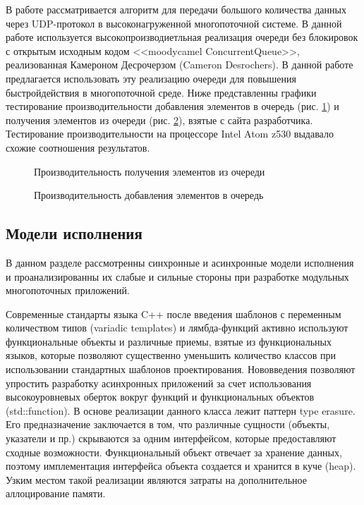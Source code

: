 В работе \cite{syzovalgorithm} рассматривается алгоритм для передачи большого количества данных через UDP-протокол в высоконагруженной многопоточной системе. В данной работе используется высокопроизводиетльная реализация очереди без блокировок с открытым исходным кодом <<moodycamel ConcurrentQueue>>, реализованная Камероном Десрочерзом (Cameron Desrochers). В данной работе предлагается использовать эту реализацию очереди для повышения быстройдействия в многопоточной среде. Ниже представленны графики тестирование производительности добавления элементов в очередь (рис. \ref{im:2_1_2_dequeue}) и получения элементов из очереди (рис. \ref{im:2_1_3_enqueue}), взятые с сайта разработчика. Тестирование производительности на процессоре Intel Atom z530 выдавало схожие соотношения результатов.

\begin{figure}[htb]
    \caption{Производительность получения элементов из очереди}
    \label{im:2_1_2_dequeue}
\end{figure}

\begin{figure}[htb]
    \caption{Производительность добавления элементов в очередь}
    \label{im:2_1_3_enqueue}
\end{figure}

\subsection{Модели исполнения}

В данном разделе рассмотренны синхронные и асинхронные модели исполнения и проанализированны их слабые и сильные стороны при разработке модульных многопоточных приложений.

Современные стандарты языка C++ после введения шаблонов с переменным количеством типов (variadic templates) и лямбда-функций активно используют функциональные объекты и различные приемы, взятые из функциональных языков, которые позволяют существенно уменьшить количество классов при использовании стандартных шаблонов проектирования. Нововведения позволяют упростить разработку асинхронных приложений за счет использования высокоуровневых оберток вокруг функций и функциональных объектов (std::function). В основе реализации данного класса лежит паттерн type erasure. Его предназначение заключается в том, что различные сущности (объекты, указатели и пр.) скрываются за одним интерфейсом, которые предоставляют сходные возможности. Функциональный объект отвечает за хранение данных, поэтому имплементация интерфейса объекта создается и хранится в куче (heap). Узким местом такой реализации являются затраты на дополнительное аллоцирование памяти.

